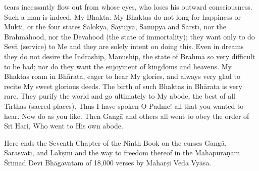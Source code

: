 tears incessantly flow out from whose eyes, who loses his outward consciousness. Such a man is indeed, My Bhakta. My Bhaktas do not long for happiness or Mukti, or the four states S\=alokya, S\=ayujya, S\=am\={\i}pya and S\=arst\={\i}, nor the Brahm\=ahood, nor the Devahood (the state of immortality); they want only to do Sev\=a (service) to Me and they are solely intent on doing this. Even in dreams they do not desire the Indraship, Manuship, the state of Brahm\=a so very difficult to be had; nor do they want the enjoyment of kingdoms and heavens. My Bhaktas roam in Bh\=arata, eager to hear My glories, and always very glad to recite My sweet glorious deeds. The birth of such Bhaktas in Bh\=arata is very rare. They purify the world and go ultimately to My abode, the best of all T\={\i}rthas (sacred places). Thus I have spoken O Padme! all that you wanted to hear. Now do as you like. Then Gang\=a and others all went to obey the order of Sr\={\i} Hari, Who went to His own abode.

Here ends the Seventh Chapter of the Ninth Book on the curses Gang\=a, Sarasvat\={\i}, and Lak\d{s}m\={\i} and the way to freedom thereof in the Mah\=apur\=a\d{n}am \'Sr\={\i}mad Dev\={\i} Bh\=agavatam of 18,000 verses by Mahar\d{s}i Veda Vy\=asa.



